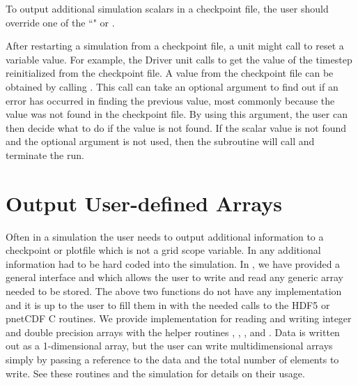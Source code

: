To output additional simulation scalars in a checkpoint file, the user should 
override one of the ``" or 
.

After restarting a simulation from a checkpoint file, a unit might
call  to reset a variable value.  For example,
the \unit{Driver} unit calls 
to get the value of the timestep  reinitialized from the
checkpoint file.  A value from the checkpoint file can be obtained by calling
.  This call can take an optional argument to find out if an
error has occurred in finding the previous value, most commonly because the value
was not found in the checkpoint file.  By using this argument, the user can then
decide what to do if the value is not found.  If the scalar value is not found 
and the optional argument is not used, then the subroutine will call  and terminate the run.



\section{Output User-defined Arrays}
\label{Sec: Output user defined arrays}

Often in a simulation the user needs to output additional information to a checkpoint or plotfile
which is not a grid scope variable.  In \flashx any additional information had to be hard coded
into the simulation.  In \flashx, we have provided a general interface 
and  which allows the user to write and read any generic array needed to
be stored.  The above two functions do not have any implementation and it is up to the user to
fill them in with the needed calls to the HDF5 or pnetCDF C routines.  We provide implementation
for reading and writing integer and double precision arrays with the helper routines
, , , and
.  Data is written
out as a 1-dimensional array, but the user can write multidimensional arrays simply by passing a
reference to the data and the total number of elements to write. See these
routines and the simulation  for details on their usage.


